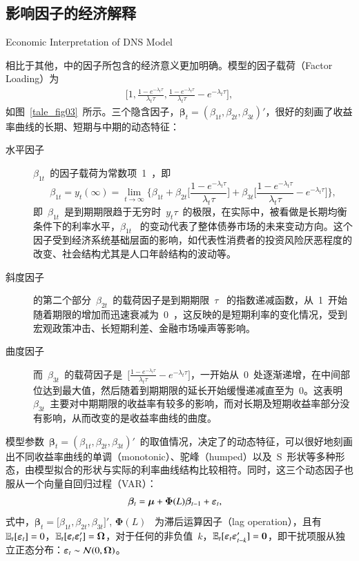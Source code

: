 \subsection{影响因子的经济解释}{Economic Interpretation of DNS Model}\label{econ}

相比于其他\tsm{}，\dns 中的因子所包含的经济意义更加明确。模型的因子载荷（Factor Loading）为
  \begin{align*}
    \bigg[ 1, \frac{1-e^{-\lambda_{t} \tau}} {\lambda_{t} \tau},
    \frac{1-e^{-\lambda_{t} \tau}} {\lambda_{t} \tau} - e^{-\lambda_{t} \tau} \bigg],
  \end{align*}
如图~\eqref{tale_fig03}~所示。三个隐含因子，$\bm{\beta}_t=(\beta_{1t},\beta_{2t},\beta_{3t})'$，很好的刻画了收益率曲线的长期、短期与中期的动态特征：
\begin{description}
  \item[水平因子] $\beta_{1t}$~的因子载荷为常数项~1~，即 \[\beta_{1t}=y_{t}(\infty)=\lim_{t\rightarrow \infty} \Big\{\beta_{1t}
        + \beta_{2t} \big[\frac{1-e^{-\lambda_{t} \tau}} {\lambda_{t} \tau} \big]
        + \beta_{3t}\big[\frac{1-e^{-\lambda_{t} \tau}} {\lambda_{t} \tau} - e^{-\lambda_{t} \tau} \big]\Big\},\]
        即~$\beta_{1t}$~是到期期限趋于无穷时~$y_t{\tau}$~的极限，在实际中，被看做是长期均衡条件下的利率水平，$\beta_{1t}$~ 的变动代表了整体债券市场的未来变动方向。这个因子受到经济系统基础层面的影响，如代表性消费者的投资风险厌恶程度的改变、社会结构尤其是人口年龄结构的波动等。
  \item[斜度因子] \dns 的第二个部分~$\beta_{2t}$~的载荷因子是到期期限~$\tau$~ 的指数递减函数，从~1~开始随着期限的增加而迅速衰减为~0~，这反映的是短期利率的变化情况，受到宏观政策冲击、长短期利差、金融市场噪声等影响。
  \item[曲度因子] 而~$\beta_{3t}$~的载荷因子是~$\Big[\frac{1-e^{-\lambda_{t} \tau}} {\lambda_{t} \tau} - e^{-\lambda_{t} \tau}\Big]$，一开始从~0~处逐渐递增，在中间部位达到最大值，然后随着到期期限的延长开始缓慢递减直至为~0。这表明~$\beta_{3t}$~主要对中期期限的收益率有较多的影响，而对长期及短期收益率部分没有影响，从而改变的是收益率曲线的曲度。
\end{description}
模型参数~$\bm{\beta}_t=(\beta_{1t},\beta_{2t},\beta_{3t})'$~的取值情况，决定了\ts 的动态特征，可以很好地刻画出不同收益率曲线的单调（monotonic）、驼峰（humped）以及~S~形状等多种形态，由模型拟合的形状与实际的利率曲线结构比较相符。同时，这三个动态因子也服从一个向量自回归过程（VAR）：
  \begin{align}
    \bm{\beta}_t &= \bm{\mu} + \bm{\Phi}(L)\bm{\beta}_{t-1} + \bm{\varepsilon}_t,
  \end{align}
    式中，$\bm{\beta}_t = \big[\beta_{1t}, \beta_{2t}, \beta_{3t}\big]'$, $\bm{\Phi}(L)$~ 为滞后运算因子（lag operation），且有~$\mathbb{E}_t[\bm{\varepsilon}_t]=0$，$\mathbb{E}_t[\bm{\varepsilon}_t \bm{\varepsilon}_t']=\bm{\Omega}$，对于任何的非负值~$k$，$\mathbb{E}_t[\bm{\varepsilon}_t \bm{\varepsilon}_{t-k}']=\bm{0}$，即干扰项服从独立正态分布：$\bm{\varepsilon}_t \sim \mathcal{N}(0,\bm{\Omega})$。

